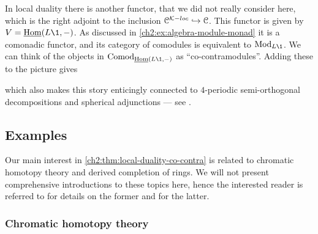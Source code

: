\begin{remark}
    In local duality there is another functor, that we did not really consider here, which is the right adjoint to the inclusion $\EuScript{C}^{\mathcal{K}-loc}\hookrightarrow \EuScript{C}$. This functor is given by $V = \iHom(L\1, -)$. As discussed in \cref{ch2:ex:algebra-module-monad} it is a comonadic functor, and its category of comodules is equivalent to $\Mod_{L\1}$. We can think of the objects in $\Comod_{\iHom(L\1,-)}$ as ``co-contramodules''. Adding these to the picture gives 
    \begin{center}
    \end{center}
    which also makes this story enticingly connected to $4$-periodic semi-orthogonal decompositions and spherical adjunctions --- see \cite[Section 2.5]{dyckerhoff-kaparanov-schechtman-soibelman_2024}. 
\end{remark}



\subsection{Examples}

Our main interest in \cref{ch2:thm:local-duality-co-contra} is related to chromatic homotopy theory and derived completion of rings. We will not present comprehensive introductions to these topics here, hence the interested reader is referred to \cite{barthel-beaudry_19} for details on the former and \cite{barthel-heard-valenzuela_2020} for the latter.

\subsubsection*{Chromatic homotopy theory}

